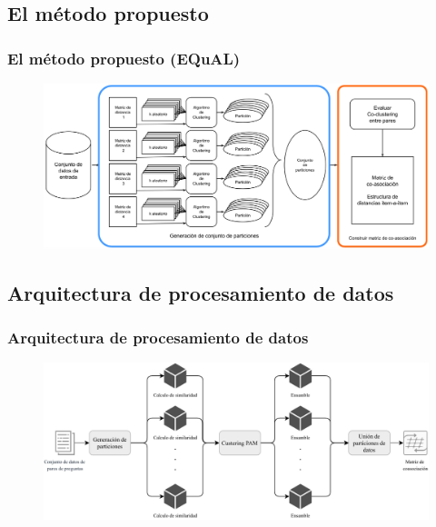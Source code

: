 \subsection{El método propuesto}
\begin{frame}
	\frametitle{El método propuesto (EQuAL)}
	\begin{figure}
		\centering
		\includegraphics[width=0.9\linewidth]{4_problema_investigacion/metodo_equal}
		\label{fig:metodoequal}
	\end{figure}
\end{frame}

\subsection{Arquitectura de procesamiento de datos}
\begin{frame}
	\frametitle{Arquitectura de procesamiento de datos}
	\begin{figure}
		\centering
		\includegraphics[width=0.9\linewidth]{../8_problema_investigacion/imagenes/equal_distribuido}
		\label{fig:equaldistribuido}
	\end{figure}
\end{frame}

